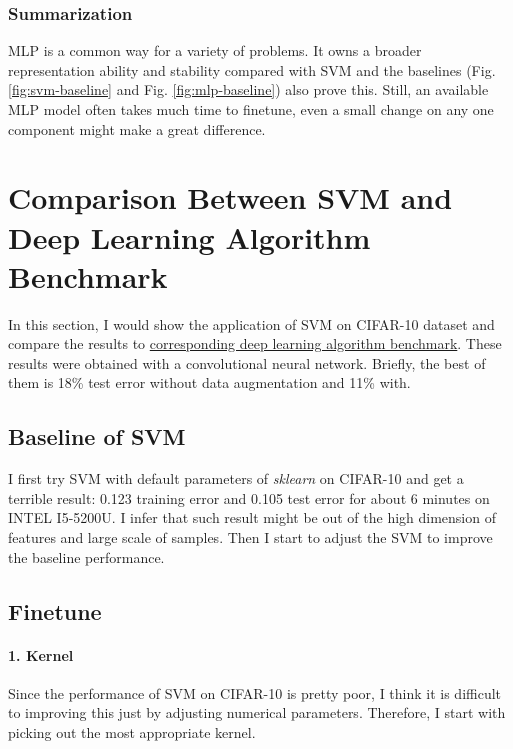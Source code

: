 \documentclass[12pt,a4paper]{article}
\theoremstyle{definition}
\begin{document}
\subsubsection{Summarization}
\label{sec:sum-mlp}

MLP is a common way for a variety of problems. It owns a broader representation ability and stability compared with SVM and the baselines (Fig. \ref{fig:svm-baseline} and Fig. \ref{fig:mlp-baseline}) also prove this. Still, an available MLP model often takes much time to finetune, even a small change on any one component might make a great difference.

\section{Comparison Between SVM and Deep Learning Algorithm Benchmark}

In this section, I would show the application of SVM on CIFAR-10 dataset \cite{cifar-10} and compare the results to \href{https://code.google.com/archive/p/cuda-convnet/}{corresponding deep learning algorithm benchmark}. These results were obtained with a convolutional neural network. Briefly, the best of them is 18\% test error without data augmentation and 11\% with.

\subsection{Baseline of SVM}
\vspace{0.01\linewidth}
I first try SVM with default parameters of \textit{sklearn} on CIFAR-10 and get a terrible result: 0.123 training error and 0.105 test error for about 6 minutes on INTEL I5-5200U. I infer that such result might be out of the high dimension of features and large scale of samples. Then I start to adjust the SVM to improve the baseline performance.

\subsection{Finetune}
\label{sec:finetune}

\paragraph{1. Kernel}

\vspace{0.01\linewidth}
Since the performance of SVM on CIFAR-10 is pretty poor, I think it is difficult to improving this just by adjusting numerical parameters. Therefore, I start with picking out the most appropriate kernel.
\end{document}
